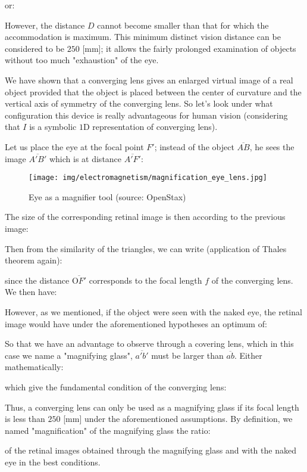 	or:
	
	However, the distance $D$ cannot become smaller than that for which the accommodation is maximum. This minimum distinct vision distance can be considered to be $250$ [mm]; it allows the fairly prolonged examination of objects without too much "exhaustion" of the eye.
	
	We have shown that a converging lens gives an enlarged virtual image of a real object provided that the object is placed between the center of curvature and the vertical axis of symmetry of the converging lens. So let's look under what configuration this device is really advantageous for human vision (considering that $I$ is a symbolic $1$D representation of converging lens).
	
	Let us place the eye at the focal point $F'$; instead of the object $\overline{AB}$, he sees the image $\overline{A'B'}$ which is at distance $\overline{A'F'}$:
	\begin{figure}[H]
		\centering
		\texttt{[image: img/electromagnetism/magnification\_eye\_lens.jpg]}
		\caption[]{Eye as a magnifier tool (source: OpenStax)}
	\end{figure}
	The size of the corresponding retinal image is then according to the previous image:
	
	Then from the similarity of the triangles, we can write (application of Thales theorem again):
	
	since the distance $\overline{\text{O}F'}$ corresponds to the focal length $f$ of the converging lens. We then have:
	
	However, as we mentioned, if the object were seen with the naked eye, the retinal image would have under the aforementioned hypotheses an optimum of:
	
	So that we have an advantage to observe through a covering lens, which in this case we name a "magnifying glass", $\overline{a'b'}$ must be larger than $\overline{ab}$. Either mathematically:
	
	which give the fundamental condition of the converging lens:
	
	Thus, a converging lens can only be used as a magnifying glass if its focal length is less than $250$ [mm] under the aforementioned assumptions. By definition, we named "magnification" of the magnifying glass the ratio:
	
	of the retinal images obtained through the magnifying glass and with the naked eye in the best conditions.
	
	\pagebreak
